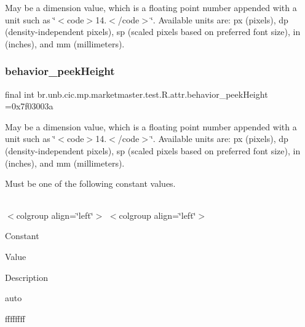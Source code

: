 May be a dimension value, which is a floating point number appended with a unit such as \char`\"{}$<$code$>$14.\+5sp$<$/code$>$\char`\"{}. Available units are\+: px (pixels), dp (density-\/independent pixels), sp (scaled pixels based on preferred font size), in (inches), and mm (millimeters). \mbox{\label{classbr_1_1unb_1_1cic_1_1mp_1_1marketmaster_1_1test_1_1R_1_1attr_a1ff7f03b16a0436d98322214917b43dc}} 
\subsubsection{\texorpdfstring{behavior\+\_\+peek\+Height}{behavior\_peekHeight}}
{\footnotesize\ttfamily final int br.\+unb.\+cic.\+mp.\+marketmaster.\+test.\+R.\+attr.\+behavior\+\_\+peek\+Height =0x7f03003a\hspace{0.3cm}{\ttfamily [static]}}

May be a dimension value, which is a floating point number appended with a unit such as \char`\"{}$<$code$>$14.\+5sp$<$/code$>$\char`\"{}. Available units are\+: px (pixels), dp (density-\/independent pixels), sp (scaled pixels based on preferred font size), in (inches), and mm (millimeters). 

Must be one of the following constant values.

\tabulinesep=1mm
\begin{longtabu} spread 0pt [c]{*{0}{|X[-1]}|}
\hline
\end{longtabu}
$<$colgroup align=\char`\"{}left\char`\"{}$>$ $<$colgroup align=\char`\"{}left\char`\"{}$>$ 

Constant

Value

Description 

auto

ffffffff\mbox{\label{classbr_1_1unb_1_1cic_1_1mp_1_1marketmaster_1_1test_1_1R_1_1attr_ac39409aa69a89c4f6b19abdc7de19b49}} 
